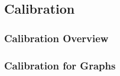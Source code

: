 \subsection{Calibration}
\subsubsection{Calibration Overview}
\subsubsection{Calibration for Graphs}